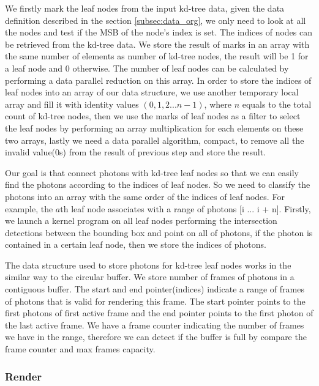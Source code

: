 We firstly mark the leaf nodes from the input kd-tree data, given the data definition described in the section \ref{subsec:data_org}, we only need to look at all the nodes and test if the MSB of the node's index is set. The indices of nodes can be retrieved from the kd-tree data. We store the result of marks in an array with the same number of elements as number of kd-tree nodes, the result will be 1 for a leaf node and 0 otherwise. The number of leaf nodes can be calculated by performing a data parallel reduction on this array. In order to store the indices of leaf nodes into an array of our data structure, we use another temporary local array and fill it with identity values \( (0, 1, 2 ... n-1) \), where \(n\) equals to the total count of kd-tree nodes, then we use the marks of leaf nodes as a filter to select the leaf nodes by performing an array multiplication for each elements on these two arrays, lastly we need a data parallel algorithm, compact, to remove all the invalid value(0s) from the result of previous step and store the result.

Our goal is that connect photons with kd-tree leaf nodes so that we can easily find the photons according to the indices of leaf nodes. So we need to classify the photons into an array with the same order of the indices of leaf nodes. For example, the \(a\)th leaf node associates with a range of photons [i ... i + n]. Firstly, we launch a kernel program on all leaf nodes performing the intersection detections between the bounding box and point on all of photons, if the photon is contained in a certain leaf node, then we store the indices of photons.

The data structure used to store photons for kd-tree leaf nodes works in the similar way to the circular buffer. We store number of frames of photons in a contiguous buffer. The start and end pointer(indices) indicate a range of frames of photons that is valid for rendering this frame. The start pointer points to the first photons of first active frame and the end pointer points to the first photon of the last active frame. We have a frame counter indicating the number of frames we have in the range, therefore we can detect if the buffer is full by compare the frame counter and max frames capacity.


\subsubsection{Render}

